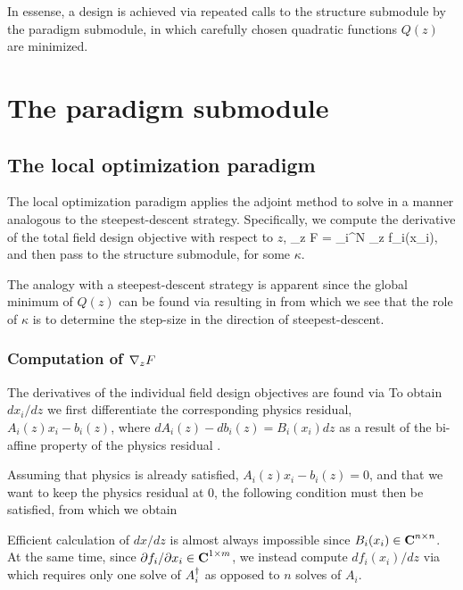 \documentclass{book}
\begin{document}
In essense, a design is achieved via repeated calls to the structure submodule
    by the paradigm submodule,
    in which carefully chosen quadratic functions $Q(z)$ are minimized.

\section{The paradigm submodule}
\subsection{The local optimization paradigm}
The local optimization paradigm applies the adjoint method to solve 
    in a manner analogous to the steepest-descent strategy.
Specifically, we compute the derivative of the total field design objective with respect to $z$,
        {\grad_z F = \sum_i^N \grad_z f_i(x_i),}
    and then pass 
    to the structure submodule, for some $\kappa$.

The analogy with a steepest-descent strategy is apparent since 
    the global minimum of $Q(z)$ can be found via
    resulting in 
    from which we see that the role of $\kappa$ is to determine the step-size 
    in the direction of steepest-descent.

\subsubsection{Computation of $\nabla_z F$}
The derivatives of the individual field design objectives are found via
To obtain ${dx_i}/{dz}$ we first differentiate the corresponding physics residual, 
    $A_i(z) x_i - b_i(z)$,
    where $dA_i(z) - db_i(z) = B_i(x_i)dz$ 
    as a result of the bi-affine property of the physics residual .

Assuming that physics is already satisfied, $A_i(z) x_i - b_i(z) = 0$,
    and that we want to keep the physics residual at 0,
    the following condition must then be satisfied,
    from which we obtain

Efficient calculation of $dx/dz$ is almost always impossible since $B_i(x_i) \in {\mbox{\bf C}}^{n \times n}$.
At the same time, since ${\partial f_i}/{\partial x_i} \in {\mbox{\bf C}}^{1 \times m}$, we instead compute $df_i(x_i)/dz$ via
    which requires only one solve of $A_i^\dagger$ as opposed to $n$ solves of $A_i$.
\end{document}
